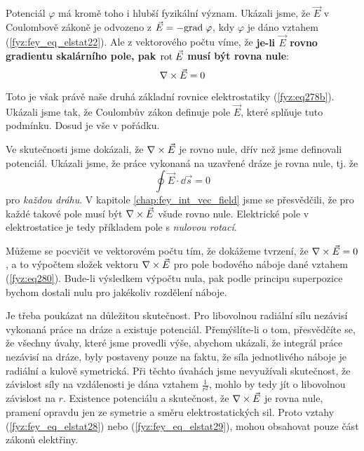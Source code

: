 {    Potenciál \(\varphi\) má kromě toho i hlubší fyzikální význam. Ukázali jsme, že \(\vec{E}\) v 
    Coulombově zákoně je odvozeno z \(\vec{E}= -\mathrm{grad\;}\varphi\), kdy \(\varphi\) je dáno vztahem 
    (\ref{fyz:fey_eq_elstat22}). Ale z vektorového počtu víme, že \textbf{je-li \(\vec{E}\) rovno 
    gradientu skalárního pole, pak \(\mathrm{rot}\;\vec{E}\) musí být rovna nule}:
    \begin{equation}\label{fyz:fey_eq_elstat29}
     \nabla\times\vec{E} = 0 
    \end{equation}
    
    Toto je však právě naše druhá základní rovnice elektrostatiky (\ref{fyz:eq278b}). 
    Ukázali jsme tak, že Coulombův zákon definuje pole \(\vec{E}\), které splňuje tuto podmínku. 
    Dosud je vše v pořádku.
    
    Ve skutečnosti jsme dokázali, že \(\nabla\times\vec{E}\) je rovno nule, dřív než jsme definovali 
    potenciál. Ukázali jsme, že práce vykonaná na uzavřené dráze je rovna nule, tj. že
    \begin{equation*}
     \oint\vec{E}\cdot\dd{\vec{s}} = 0 
    \end{equation*}  
    pro \emph{každou dráhu}. V kapitole \ref{chap:fey_int_vec_field} jsme se přesvědčili, že pro 
    každé takové pole musí být \(\nabla\times\vec{E}\) všude rovno nule. Elektrické pole v elektrostatice je 
    tedy příkladem pole s \emph{nulovou rotací}. 
    
    Můžeme se pocvičit ve vektorovém počtu tím, že dokážeme tvrzení, že \(\nabla\times\vec{E}=0\), a to 
    výpočtem složek vektoru \(\nabla\times\vec{E}\) pro pole bodového náboje dané vztahem 
    (\ref{fyz:eq280}). Bude-li výsledkem výpočtu nula, pak podle principu superpozice 
    bychom dostali nulu pro jakékoliv rozdělení náboje.
    
    Je třeba poukázat na důležitou skutečnost. Pro libovolnou radiální sílu nezávisí vykonaná práce 
    na dráze a existuje potenciál. Přemýšlíte-li o tom, přesvědčíte se, že všechny úvahy, které 
    jsme provedli výše, abychom ukázali, že integrál práce nezávisí na dráze, byly postaveny pouze 
    na faktu, že síla jednotlivého náboje je radiální a kulově symetrická. Při těchto úvahách jsme 
    nevyužívali skutečnost, že závislost síly na vzdálenosti je dána vztahem \(\frac{1}{r^2}\), 
    mohlo by tedy jít o libovolnou závislost na \(r\). Existence potenciálu a skutečnost, že 
    \(\nabla\times\vec{E}\) je rovna nule, pramení opravdu jen ze symetrie a směru elektrostatických sil. 
    Proto vztahy (\ref{fyz:fey_eq_elstat28}) nebo (\ref{fyz:fey_eq_elstat29}), mohou obsahovat 
    pouze část zákonů elektřiny. 
 
}
